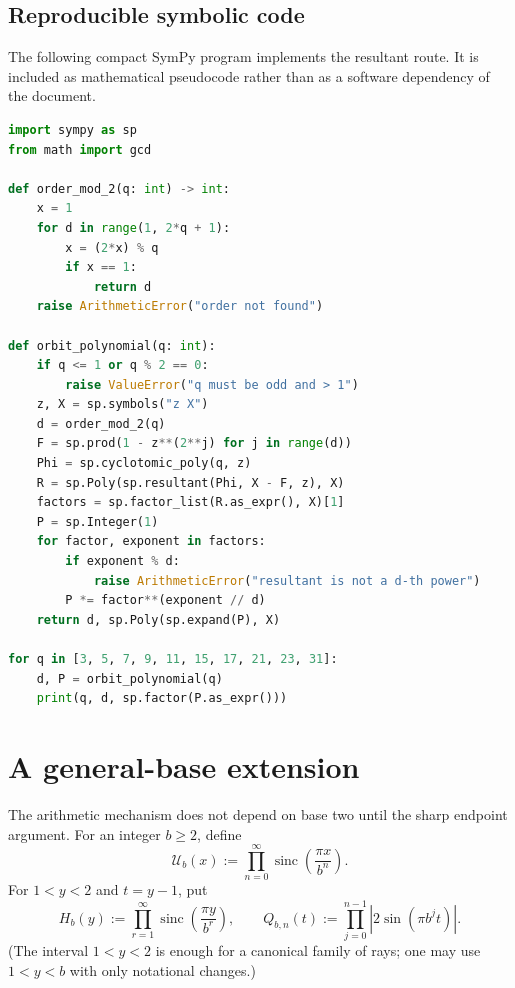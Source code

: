 \documentclass[11pt,oneside]{article}
\theoremstyle{definition}
\theoremstyle{remark}
\newcommand{\sinc}{\operatorname{sinc}}
\begin{document}
\subsection{Reproducible symbolic code}

The following compact SymPy program implements the resultant route. It is included
as mathematical pseudocode rather than as a software dependency of the document.

\begin{lstlisting}[style=pseudo,language=Python,caption={Orbit-polynomial computation.}]
import sympy as sp
from math import gcd

def order_mod_2(q: int) -> int:
    x = 1
    for d in range(1, 2*q + 1):
        x = (2*x) % q
        if x == 1:
            return d
    raise ArithmeticError("order not found")

def orbit_polynomial(q: int):
    if q <= 1 or q % 2 == 0:
        raise ValueError("q must be odd and > 1")
    z, X = sp.symbols("z X")
    d = order_mod_2(q)
    F = sp.prod(1 - z**(2**j) for j in range(d))
    Phi = sp.cyclotomic_poly(q, z)
    R = sp.Poly(sp.resultant(Phi, X - F, z), X)
    factors = sp.factor_list(R.as_expr(), X)[1]
    P = sp.Integer(1)
    for factor, exponent in factors:
        if exponent % d:
            raise ArithmeticError("resultant is not a d-th power")
        P *= factor**(exponent // d)
    return d, sp.Poly(sp.expand(P), X)

for q in [3, 5, 7, 9, 11, 15, 17, 21, 23, 31]:
    d, P = orbit_polynomial(q)
    print(q, d, sp.factor(P.as_expr()))
\end{lstlisting}

\section{A general-base extension}\label{sec:general-base}

The arithmetic mechanism does not depend on base two until the sharp endpoint
argument. For an integer $b\ge2$, define
\begin{equation}
 \mathscr U_b(x):=\prod_{n=0}^{\infty}
 \sinc\!\left(\frac{\pi x}{b^n}\right).
 \label{eq:Ub}
\end{equation}
For $1<y<2$ and $t=y-1$, put
\begin{equation}
 H_b(y):=\prod_{r=1}^{\infty}\sinc\!\left(\frac{\pi y}{b^r}\right),
 \qquad
 Q_{b,n}(t):=\prod_{j=0}^{n-1}|2\sin(\pi b^jt)|.
 \label{eq:Hb-Qb}
\end{equation}
(The interval $1<y<2$ is enough for a canonical family of rays; one may use
$1<y<b$ with only notational changes.)
\end{document}
